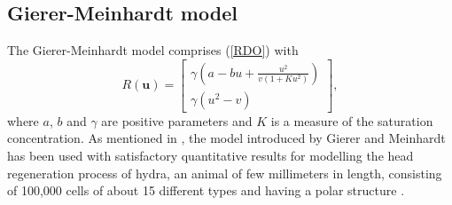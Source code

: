 \documentclass[12pt]{article}
\numberwithin{equation}{section}
\begin{document}
\subsection{Gierer-Meinhardt model}
The Gierer-Meinhardt model \cite{Gierer} comprises (\ref{RDO}) with
\begin{equation}
R(\mathbf u) = \left[ \begin{array}{l}
\gamma (a - bu + \frac{{{u^2}}}{{v(1 + K{u^2})}})\\
\gamma ({u^2} - v)
\end{array} \right],\end{equation}
where $a$, $b$ and $\gamma$ are positive parameters and $K$ is a measure of the saturation concentration.
As mentioned in \cite{Ghergu}, the model introduced by Gierer and Meinhardt has been
used with satisfactory quantitative results for modelling the head regeneration process
of hydra, an animal of few millimeters in length, consisting of 100,000 cells of about 15
different types and having a polar structure \cite{Ghergu}.
\end{document}
